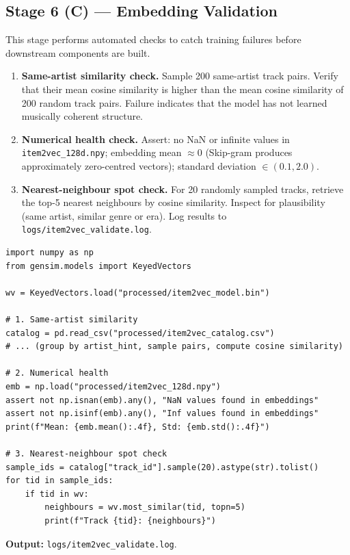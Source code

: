 \documentclass[11pt]{article}
\begin{document}
\subsection{Stage 6 (C) --- Embedding Validation}

This stage performs automated checks to catch training failures before
downstream components are built.

\begin{enumerate}
  \item \textbf{Same-artist similarity check.}
        Sample 200 same-artist track pairs. Verify that their mean cosine
        similarity is higher than the mean cosine similarity of 200
        random track pairs. Failure indicates that the model has not
        learned musically coherent structure.
  \item \textbf{Numerical health check.}
        Assert: no NaN or infinite values in \texttt{item2vec\_128d.npy};
        embedding mean $\approx 0$ (Skip-gram produces approximately
        zero-centred vectors); standard deviation $\in (0.1, 2.0)$.
  \item \textbf{Nearest-neighbour spot check.}
        For 20 randomly sampled tracks, retrieve the top-5 nearest
        neighbours by cosine similarity. Inspect for plausibility
        (same artist, similar genre or era). Log results to
        \texttt{logs/item2vec\_validate.log}.
\end{enumerate}

\begin{lstlisting}
import numpy as np
from gensim.models import KeyedVectors

wv = KeyedVectors.load("processed/item2vec_model.bin")

# 1. Same-artist similarity
catalog = pd.read_csv("processed/item2vec_catalog.csv")
# ... (group by artist_hint, sample pairs, compute cosine similarity)

# 2. Numerical health
emb = np.load("processed/item2vec_128d.npy")
assert not np.isnan(emb).any(), "NaN values found in embeddings"
assert not np.isinf(emb).any(), "Inf values found in embeddings"
print(f"Mean: {emb.mean():.4f}, Std: {emb.std():.4f}")

# 3. Nearest-neighbour spot check
sample_ids = catalog["track_id"].sample(20).astype(str).tolist()
for tid in sample_ids:
    if tid in wv:
        neighbours = wv.most_similar(tid, topn=5)
        print(f"Track {tid}: {neighbours}")
\end{lstlisting}

\textbf{Output:} \texttt{logs/item2vec\_validate.log}.
\end{document}
